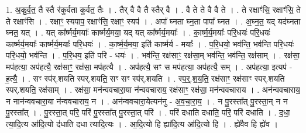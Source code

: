 \documentclass[17pt]{extarticle}
\begin{document}
1. अ॒कु॒र्व॒त॒ तै स्तै र॑कुर्वता कुर्वत॒ तैः । . तैर् वै वै तै स्तैर् वै । . वै ते ते वै वै ते । . ते रक्षाꣳ॑सि॒ रक्षाꣳ॑सि॒ ते ते रक्षाꣳ॑सि । . रक्षाꣳ॒॒ स्यपाप॒ रक्षाꣳ॑सि॒ रक्षाꣳ॒॒ स्यप॑ । . अपा᳚ घ्नता घ्न॒ता पापा᳚ घ्नत । . अ॒घ्न॒त॒ यद् यद॑घ्नता घ्नत॒ यत् । . यत् का᳚र्ष्मर्य॒मयाः᳚ कार्ष्मर्य॒मया॒ यद् यत् का᳚र्ष्मर्य॒मयाः᳚ । . का॒र्ष्म॒र्य॒मयाः᳚ परि॒धयः॑ परि॒धयः॑ कार्ष्मर्य॒मयाः᳚ कार्ष्मर्य॒मयाः᳚ परि॒धयः॑ । . का॒र्ष्म॒र्य॒मया॒ इति॑ कार्ष्मर्य - मयाः᳚ । . प॒रि॒धयो॒ भव॑न्ति॒ भव॑न्ति परि॒धयः॑ परि॒धयो॒ भव॑न्ति । . प॒रि॒धय॒ इति॑ परि - धयः॑ । . भव॑न्ति॒ रक्ष॑साꣳ॒॒ रक्ष॑सा॒म् भव॑न्ति॒ भव॑न्ति॒ रक्ष॑साम् । . रक्ष॑सा॒ मप॑हत्या॒ अप॑हत्यै॒ रक्ष॑साꣳ॒॒ रक्ष॑सा॒ मप॑हत्यै । . अप॑हत्यै॒ सꣳ स मप॑हत्या॒ अप॑हत्यै॒ सम् । . अप॑हत्या॒ इत्यप॑ - ह॒त्यै॒ । . सꣳ स्प॑र्.शयति स्पर्.शयति॒ सꣳ सꣳ स्प॑र्.शयति । . स्प॒र्॒.श॒य॒ति॒ रक्ष॑साꣳ॒॒ रक्ष॑साꣳ स्पर्.शयति स्पर्.शयति॒ रक्ष॑साम् । . रक्ष॑सा॒ मन॑न्ववचारा॒या न॑न्ववचाराय॒ रक्ष॑साꣳ॒॒ रक्ष॑सा॒ मन॑न्ववचाराय । . अन॑न्ववचाराय॒ न नान॑न्ववचारा॒या न॑न्ववचाराय॒ न । . अन॑न्ववचारा॒येत्यन॑नु - अ॒व॒चा॒रा॒य॒ । . न पु॒रस्ता᳚त् पु॒रस्ता॒न् न न पु॒रस्ता᳚त् । . पु॒रस्ता॒त् परि॒ परि॑ पु॒रस्ता᳚त् पु॒रस्ता॒त् परि॑ । . परि॑ दधाति दधाति॒ परि॒ परि॑ दधाति । . द॒धा॒ त्या॒दि॒त्य आ॑दि॒त्यो द॑धाति दधा त्यादि॒त्यः । . आ॒दि॒त्यो हि ह्या॑दि॒त्य आ॑दि॒त्यो हि । . ह्ये॑वैव हि ह्ये॑व । \newline
\end{document}
